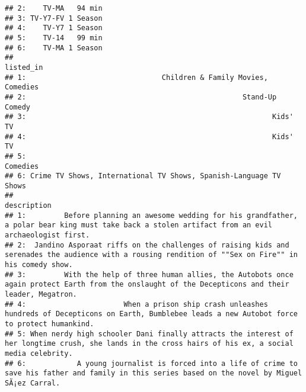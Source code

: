 \documentclass[]{article}
\newenvironment{Shaded}{\begin{snugshade}}{\end{snugshade}}
\newcommand{\DataTypeTok}[1]{\textcolor[rgb]{0.13,0.29,0.53}{#1}}
\newcommand{\KeywordTok}[1]{\textcolor[rgb]{0.13,0.29,0.53}{\textbf{#1}}}
\newcommand{\NormalTok}[1]{#1}
\newcommand{\OperatorTok}[1]{\textcolor[rgb]{0.81,0.36,0.00}{\textbf{#1}}}
\newcommand{\StringTok}[1]{\textcolor[rgb]{0.31,0.60,0.02}{#1}}
\begin{document}
\begin{verbatim}
## 2:    TV-MA   94 min
## 3: TV-Y7-FV 1 Season
## 4:    TV-Y7 1 Season
## 5:    TV-14   99 min
## 6:    TV-MA 1 Season
##                                                            listed_in
## 1:                                Children & Family Movies, Comedies
## 2:                                                   Stand-Up Comedy
## 3:                                                          Kids' TV
## 4:                                                          Kids' TV
## 5:                                                          Comedies
## 6: Crime TV Shows, International TV Shows, Spanish-Language TV Shows
##                                                                                                                                             description
## 1:         Before planning an awesome wedding for his grandfather, a polar bear king must take back a stolen artifact from an evil archaeologist first.
## 2:  Jandino Asporaat riffs on the challenges of raising kids and serenades the audience with a rousing rendition of ""Sex on Fire"" in his comedy show.
## 3:         With the help of three human allies, the Autobots once again protect Earth from the onslaught of the Decepticons and their leader, Megatron.
## 4:                       When a prison ship crash unleashes hundreds of Decepticons on Earth, Bumblebee leads a new Autobot force to protect humankind.
## 5: When nerdy high schooler Dani finally attracts the interest of her longtime crush, she lands in the cross hairs of his ex, a social media celebrity.
## 6:            A young journalist is forced into a life of crime to save his father and family in this series based on the novel by Miguel SÃ¡ez Carral.
\end{verbatim}

\begin{Shaded}
\end{Shaded}
\end{document}
